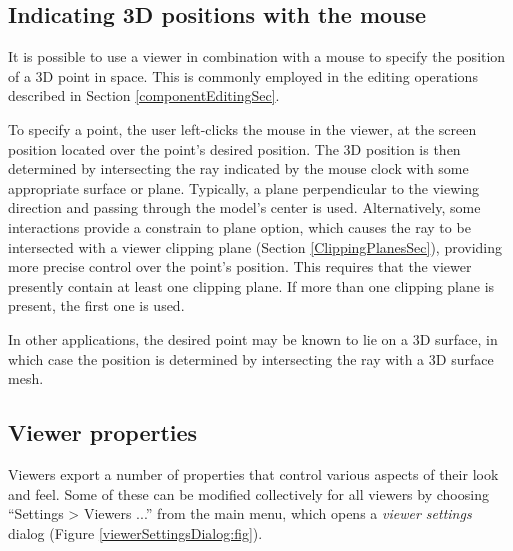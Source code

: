 \documentclass{article}
\begin{document}
\subsection{Indicating 3D positions with the mouse}
\label{indicatingPositionsSec}

It is possible to use a viewer in combination with a mouse to specify the
position of a 3D point in space. This is commonly employed in the
editing operations described in Section \ref{componentEditingSec}.

To specify a point, the user left-clicks the mouse in the viewer, at
the screen position located over the point's desired position. The 3D
position is then determined by intersecting the ray indicated by the
mouse clock with some appropriate surface or plane. Typically, a plane
perpendicular to the viewing direction and passing through the model's
center is used. Alternatively, some interactions provide a {\sf constrain
to plane} option, which causes the ray to be intersected with a viewer
clipping plane (Section \ref{ClippingPlanesSec}), providing more precise control
over the point's position. This requires that the viewer presently
contain at least one clipping plane. If more than one clipping plane
is present, the first one is used.

In other applications, the desired point may be known to lie on a 3D
surface, in which case the position is determined by intersecting the
ray with a 3D surface mesh.

\subsection{Viewer properties}
\label{viewerSettings:sec}

Viewers export a number of properties that control various aspects of
their look and feel. Some of these can be modified collectively for
all viewers by choosing {\sf ``Settings > Viewers ...''} from the
main menu, which opens a {\it viewer settings} dialog (Figure
\ref{viewerSettingsDialog:fig}).
\end{document}
